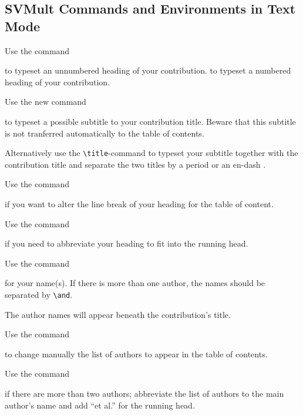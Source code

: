 \documentclass[graybox]{svmult}
\begin{document}
\begin{refguide}
\begin{sloppy}
\subsection{SVMult Commands and Environments in Text Mode}\label{subsec:4}

Use the command

\cprotect\boxtext{%
    \verb|\title*{}|}

to typeset an unnumbered heading of your contribution.
\cprotect\boxtext{\verb|\title{}|}
to typeset a numbered heading of your contribution.

Use the new command

\cprotect{}


to typeset a possible subtitle to your contribution title. Beware that this subtitle
is not tranferred automatically to the table of contents.


Alternatively use the \verb|\title|-command to typeset your subtitle together with
the contribution title and separate the two titles by a period or an
en-dash . 


Use the command

\cprotect\boxtext{\verb|\toctitle{}|}


if you want to alter the line break of your heading for the table of content.


Use the command

\cprotect\boxtext{\verb|\titlerunning{}|}


if you need to abbreviate your heading to fit into the running head.


Use the command

\cprotect\boxtext{\verb|\author{}|}


for your name(s). If there is more than one author, the names should be separated by \verb|\and|.


The author names will appear beneath the contribution's title.


Use the command

\cprotect\boxtext{\verb|\tocauthor{}|}


to change manually the list of authors to appear in the table of contents.


Use the command

\cprotect\boxtext{\verb|\authorrunning{}|}


if there are more than two authors; abbreviate the list of authors to the main
author's name and add ``et al.'' for the running head.



\end{sloppy}
\end{refguide}
\end{document}
